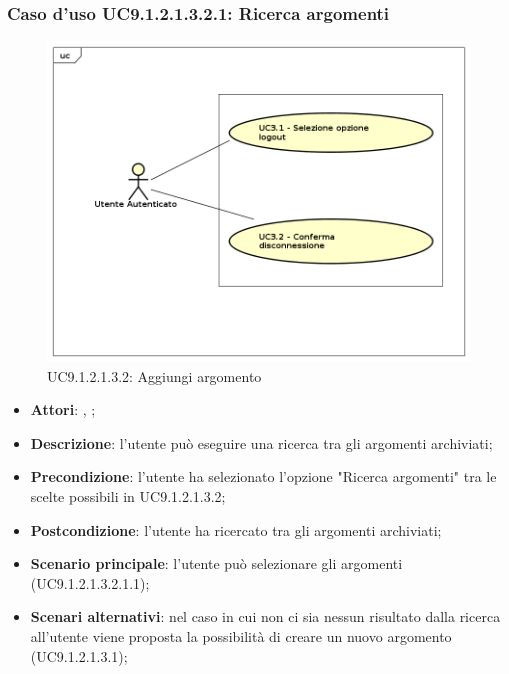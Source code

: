 							\subsubsection{Caso d'uso UC9.1.2.1.3.2.1: Ricerca argomenti}
							\label{UC9.1.2.1.3.2.1}
							\begin{figure}[h]
								\centering
								\includegraphics[scale=0.5,keepaspectratio]{UML/UC9.png}
								\caption{UC9.1.2.1.3.2: Aggiungi argomento}
							\end{figure}
							\FloatBarrier
							\begin{itemize}
								\item \textbf{Attori}: \uau, \uaupro;
								\item \textbf{Descrizione}: l'utente può eseguire una ricerca tra gli argomenti archiviati; 
								\item \textbf{Precondizione}: l'utente ha selezionato l'opzione "Ricerca argomenti" tra le scelte possibili in UC9.1.2.1.3.2;
								\item \textbf{Postcondizione}: l'utente ha ricercato tra gli argomenti archiviati;
								\item \textbf{Scenario principale}: l'utente può selezionare gli argomenti (UC9.1.2.1.3.2.1.1); 
								\item \textbf{Scenari alternativi}: nel caso in cui non ci sia nessun risultato dalla ricerca all'utente viene proposta la possibilità di creare un nuovo argomento (UC9.1.2.1.3.1);
							\end{itemize}
							
